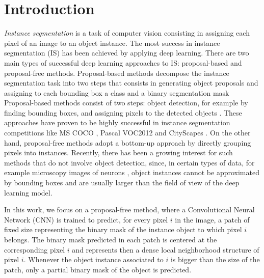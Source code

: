 
\section{Introduction}

\emph{Instance segmentation} is a task of computer vision consisting in assigning each pixel of an image to an object instance. %
The most success in instance segmentation (IS) has been achieved by applying deep learning. %
There are two main types of successful deep learning approaches to IS: proposal-based and proposal-free methods. 
Proposal-based methods decompose the instance segmentation task into two steps that consists in generating object proposals and assigning to each bounding box a class and a binary segmentation mask
Proposal-based methods consist of two steps: object detection, for example by finding bounding boxes, and assigning pixels to the detected objects \cite{he2017mask,dai2016instance,li2017fully}. These approaches have proven to be highly successful in instance segmentation competitions like MS COCO \cite{lin2014microsoft}, Pascal VOC2012 \cite{everingham2010pascal} and CityScapes \cite{cordts2016cityscapes}. 
On the other hand, proposal-free methods adopt a bottom-up approach by directly grouping pixels into instances. Recently, there has been a growing interest for such methods that do not involve object detection, since, in certain types of data, for example microscopy images of neurons \cite{arganda2015crowdsourcing}, object instances cannot be approximated by bounding boxes and are usually larger than the field of view of the deep learning model. 

In this work, we focus on a proposal-free method, where a Convolutional Neural Network (CNN) is trained to predict, for every pixel $i$ in the image, a patch of fixed size representing the binary mask of the instance object to which pixel $i$ belongs. The binary mask predicted in each patch is centered at the corresponding pixel $i$ and represents then a dense local neighborhood structure of pixel $i$. Whenever the object instance associated to $i$ is bigger than the size of the patch, only a partial binary mask of the object is predicted. 


